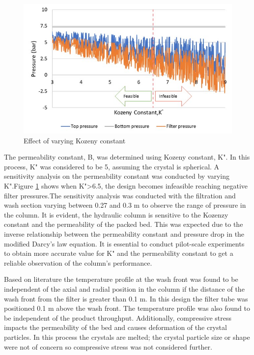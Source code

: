 \begin{figure}
\centering
\includegraphics[width=\linewidth]{chapters/3-separation/figures/kozeny.jpg}
\caption{Effect of varying Kozeny constant}
\label{fig:koz_col}
\end{figure}

The permeability constant, B, was determined using Kozeny constant, K".  In this process, K" was considered to be 5, assuming the crystal is spherical. A sensitivity analysis on the permeability constant was conducted by varying K".Figure \ref{fig:koz_col} shows when K">6.5, the design becomes infeasible reaching negative filter pressures.The sensitivity analysis was conducted with the filtration and wash section varying between 0.27 and 0.3 m to observe the range of pressure in the column. It is evident, the hydraulic column is sensitive to the Kozenzy constant and the permeability of the packed bed. This was expected due to the inverse relationship between the permeability constant and pressure drop in the modified Darcy's law equation. It is essential to conduct pilot-scale experiments to obtain more accurate value for K" and the permeability constant to get a reliable observation of the column's performance. 

Based on literature \cite{jansens_furification_1995} the temperature profile at the wash front was found to be independent of the axial and radial position in the column if the distance of the wash front from the filter is greater than 0.1 m. In this design the filter tube was positioned 0.1 m above the wash front. The temperature profile was also found to be independent of the product throughput. Additionally, compressive stress impacts the permeability of the bed and causes deformation of the crystal particles. In this process the crystals are melted; the crystal particle size or shape were not of concern so compressive stress was not considered further. 

